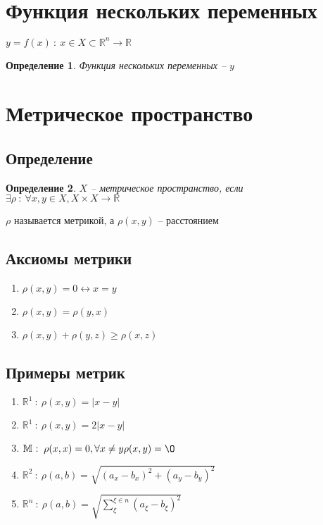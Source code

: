 \documentclass[a4paper, 12pt, titlepage]{article}
\newtheorem{Def}{Определение}[section]
\newcommand{\Real}{\mathbb{R}}
\begin{document}
	\begin{titlepage}
	\end{titlepage}
	
	\section{Функция нескольких переменных}
		$y = f(x) \:\colon\: x \in X \subset \Real^n \to \Real$\\
		\begin{Def}	
			Функция нескольких переменных -- $y$
		\end{Def}
		
	\section{Метрическое пространство}
		\subsection{Определение}
			\begin{Def}
				$X$ -- метрическое пространство, если $\exists \rho \:\colon\: \forall x, y \in X, X \times X \to \Real$
			\end{Def}
			$\rho$ называется метрикой, а $\rho(x, y)$ -- расстоянием
		\subsection{Аксиомы метрики}
			\begin{enumerate}
				\item $\rho(x, y) = 0 \leftrightarrow x = y$
				\item $\rho(x, y) = \rho(y, x)$
				\item $\rho(x, y) + \rho(y, z) \ge \rho(x, z)$
			\end{enumerate}
		\subsection{Примеры метрик}	
			\begin{enumerate}
				\item $\mathbb{R}^1 \:\colon\: \rho(x, y) = |x - y|$
				\item $\mathbb{R}^1 \:\colon\: \rho(x, y) = 2|x - y|$
				\item $\mathbb{M} \:\colon\: \rho(x, x) = 0, \forall x \ne y \rho(x, y) = \O$
				\item $\mathbb{R}^2 \:\colon\: \rho(a, b) = \sqrt{(a_x - b_x)^2 + (a_y - b_y)^2}$
				\item $\mathbb{R}^n \:\colon\: \rho(a, b) = \sqrt{\sum_{\xi}^{\xi \in n} (a_\xi - b_\xi)^2}$
			\end{enumerate}
\end{document}
